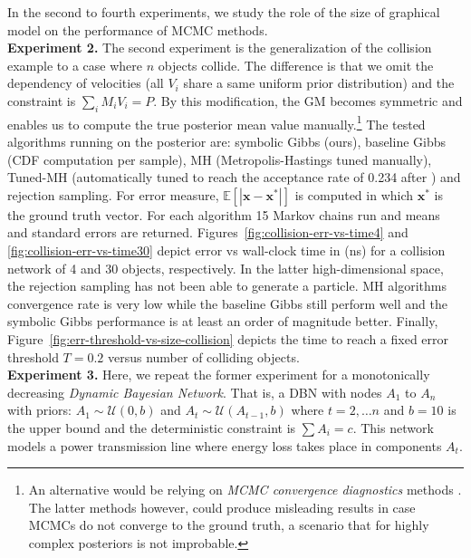 \documentclass{article}
\newcommand{\bvec}[1]{\textbf{#1}}
\begin{document}
In the second to fourth experiments, we study the role of the size of graphical model on the performance of MCMC methods.
\\
\textbf{Experiment 2.} The second experiment is the generalization of the collision example to a case where $n$ objects 
collide. The difference is that we omit the dependency of velocities (all $V_i$ share a same uniform prior distribution) and the constraint is $\sum_i{M_i V_i} = P$. By this modification, the GM becomes symmetric and enables us to compute the true posterior mean value manually.\footnote{An alternative would be relying on \emph{MCMC convergence diagnostics} methods \cite{cowles1996markov}. The latter methods however, could produce misleading results in case MCMCs do not converge to the ground truth, a scenario that for highly complex posteriors is not improbable.} 
The tested algorithms running on the posterior are: symbolic Gibbs (ours), baseline Gibbs (CDF computation per sample), 
MH (Metropolis-Hastings tuned manually), Tuned-MH 
(automatically tuned to reach the acceptance rate of 0.234 after \cite{roberts1997weak}) and rejection sampling.
For error measure, $\mathbb{E}[|\bvec{x} - \bvec{x}^*|]$ is computed in which 
$\bvec{x}^*$ is the ground truth vector.
For each algorithm 15 Markov chains run and means and standard errors are returned.     
Figures~\ref{fig:collision-err-vs-time4} 
and 
\ref{fig:collision-err-vs-time30} 
depict error vs wall-clock time in (ns) %
for a collision network of 4 and 30 objects, respectively. %
In the latter high-dimensional space, the rejection sampling has not been able to generate a particle.
MH algorithms convergence rate is very low while the baseline Gibbs still perform well and the symbolic Gibbs performance is at least an order of magnitude better.
Finally, Figure~\ref{fig:err-threshold-vs-size-collision} depicts the time to reach a fixed error threshold $T=0.2$ 
versus number of colliding objects. 
%
\\
\textbf{Experiment 3.} Here, we repeat the former experiment for a 
monotonically decreasing \emph{Dynamic Bayesian Network}. That is, a DBN with nodes $A_1$ to $A_n$
with priors: $A_1 \sim \mathcal{U}(0, b)$ and $A_t \sim \mathcal{U}(A_{t-1}, b)$ where 
$t = 2, \ldots n$ and $b=10$ is the upper bound and the deterministic constraint is $\sum A_i = c$.
This network models a power transmission line where energy loss takes place in components $A_t$.
\end{document}
